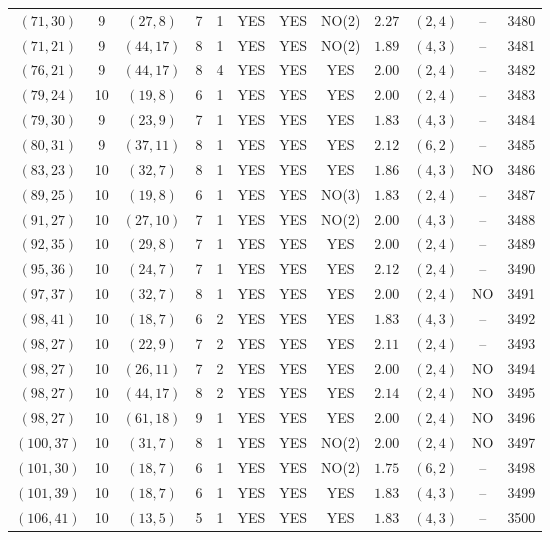 \begin{longtable}{|c|c|c|c|c|c|c|c|c|c|c|c|}
$(71,30)$ & 9 & $(27,8)$ & 7 & 1 & YES & YES & NO(2) & $2.27$ & $(2,4)$ & -- & 3480\\
$(71,21)$ & 9 & $(44,17)$ & 8 & 1 & YES & YES & NO(2) & $1.89$ & $(4,3)$ & -- & 3481\\
$(76,21)$ & 9 & $(44,17)$ & 8 & 4 & YES & YES & YES & $2.00$ & $(2,4)$ & -- & 3482\\
$(79,24)$ & 10 & $(19,8)$ & 6 & 1 & YES & YES & YES & $2.00$ & $(2,4)$ & -- & 3483\\
$(79,30)$ & 9 & $(23,9)$ & 7 & 1 & YES & YES & YES & $1.83$ & $(4,3)$ & -- & 3484\\
$(80,31)$ & 9 & $(37,11)$ & 8 & 1 & YES & YES & YES & $2.12$ & $(6,2)$ & -- & 3485\\
$(83,23)$ & 10 & $(32,7)$ & 8 & 1 & YES & YES & YES & $1.86$ & $(4,3)$ & NO & 3486\\
$(89,25)$ & 10 & $(19,8)$ & 6 & 1 & YES & YES & NO(3) & $1.83$ & $(2,4)$ & -- & 3487\\
$(91,27)$ & 10 & $(27,10)$ & 7 & 1 & YES & YES & NO(2) & $2.00$ & $(4,3)$ & -- & 3488\\
$(92,35)$ & 10 & $(29,8)$ & 7 & 1 & YES & YES & YES & $2.00$ & $(2,4)$ & -- & 3489\\
$(95,36)$ & 10 & $(24,7)$ & 7 & 1 & YES & YES & YES & $2.12$ & $(2,4)$ & -- & 3490\\
$(97,37)$ & 10 & $(32,7)$ & 8 & 1 & YES & YES & YES & $2.00$ & $(2,4)$ & NO & 3491\\
$(98,41)$ & 10 & $(18,7)$ & 6 & 2 & YES & YES & YES & $1.83$ & $(4,3)$ & -- & 3492\\
$(98,27)$ & 10 & $(22,9)$ & 7 & 2 & YES & YES & YES & $2.11$ & $(2,4)$ & -- & 3493\\
$(98,27)$ & 10 & $(26,11)$ & 7 & 2 & YES & YES & YES & $2.00$ & $(2,4)$ & NO & 3494\\
$(98,27)$ & 10 & $(44,17)$ & 8 & 2 & YES & YES & YES & $2.14$ & $(2,4)$ & NO & 3495\\
$(98,27)$ & 10 & $(61,18)$ & 9 & 1 & YES & YES & YES & $2.00$ & $(2,4)$ & NO & 3496\\
$(100,37)$ & 10 & $(31,7)$ & 8 & 1 & YES & YES & NO(2) & $2.00$ & $(2,4)$ & NO & 3497\\
$(101,30)$ & 10 & $(18,7)$ & 6 & 1 & YES & YES & NO(2) & $1.75$ & $(6,2)$ & -- & 3498\\
$(101,39)$ & 10 & $(18,7)$ & 6 & 1 & YES & YES & YES & $1.83$ & $(4,3)$ & -- & 3499\\
$(106,41)$ & 10 & $(13,5)$ & 5 & 1 & YES & YES & YES & $1.83$ & $(4,3)$ & -- & 3500\\

\end{longtable}
